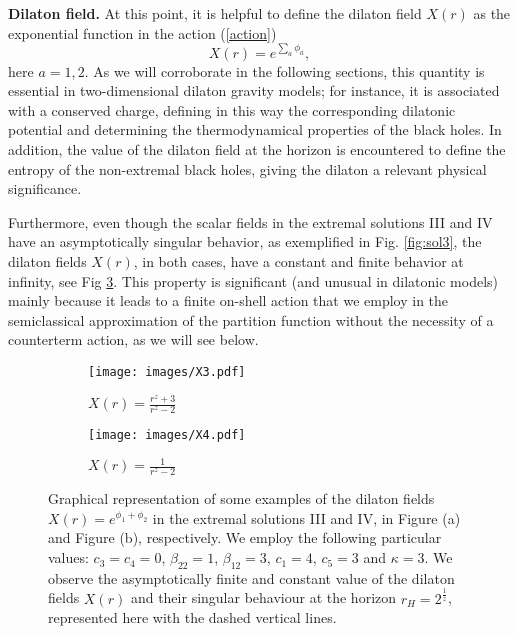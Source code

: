 \documentclass[sn-mathphys,Numbered]{sn-jnl}%
\theoremstyle{thmstyleone}%
\theoremstyle{thmstyletwo}%
\theoremstyle{thmstylethree}%
\begin{document}
{\bf Dilaton field.} At this point, it is helpful to define the dilaton field $X(r)$ as the exponential function in the action (\ref{action})
\begin{equation}
   X(r)= e^{\sum_a \phi_a}, 
\end{equation}
here $a=1,2$. As we will corroborate in the following sections, this quantity is essential in two-dimensional dilaton gravity models; for instance, it is associated with a conserved charge, defining in this way the corresponding dilatonic potential and determining the thermodynamical properties of the black holes. In addition, the value of the dilaton field at the horizon is encountered to define the entropy of the non-extremal black holes, giving the dilaton a relevant physical significance. 

Furthermore, even though the scalar fields in the extremal solutions III and IV have an asymptotically singular behavior, as exemplified in Fig. \ref{fig:sol3}, the dilaton fields $X(r)$, in both cases, have a constant and finite behavior at infinity, see Fig \ref{img:dilaton fields}. This property is significant (and unusual in dilatonic models) mainly because it leads to a finite on-shell action that we employ in the semiclassical approximation of the partition function without the necessity of a counterterm action, as we will see below.
%
\begin{figure}[]

\begin{subfigure}{0.5\textwidth}
\texttt{[image: images/X3.pdf]} 
\caption{$X(r)=\frac{r^z+3}{r^z-2}$}
\label{Xa}
\end{subfigure}
\begin{subfigure}{0.5\textwidth}
\texttt{[image: images/X4.pdf]}
\caption{$X(r)=\frac{1}{r^z-2}$}
\label{Xb}
\end{subfigure}

\caption{Graphical representation of some examples of the dilaton fields $X(r)= e^{ \phi_1+\phi_2}$ in the extremal solutions III and IV, in Figure (a) and Figure (b), respectively. We employ the following particular values: $c_3=c_4=0$, $\beta_{22}=1$, $\beta_{12}=3$, $c_1=4$, $c_5=3$ and $\kappa=3$. We observe the asymptotically finite and constant value of the dilaton fields $X(r)$ and their singular behaviour at the horizon $r_H=2^{\frac{1}{z}}$, represented here with the dashed vertical lines.}
\label{img:dilaton fields}
\end{figure}
\end{document}
